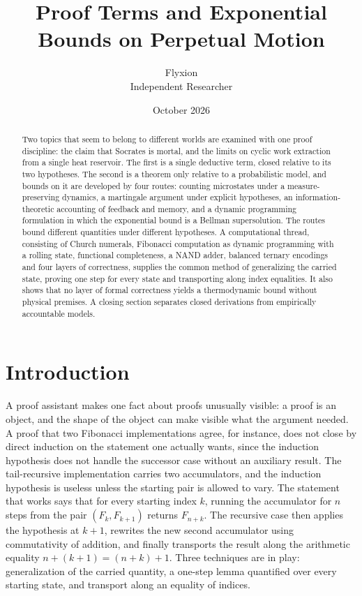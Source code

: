 \documentclass[11pt]{article}
\title{Proof Terms and Exponential Bounds on Perpetual Motion}
\author{Flyxion\\Independent Researcher}
\date{October 2026}
\theoremstyle{definition}
\theoremstyle{remark}
\begin{document}
\maketitle

\begin{abstract}
\noindent
Two topics that seem to belong to different worlds are examined with one proof discipline: the claim that Socrates is mortal, and the limits on cyclic work extraction from a single heat reservoir. The first is a single deductive term, closed relative to its two hypotheses. The second is a theorem only relative to a probabilistic model, and bounds on it are developed by four routes: counting microstates under a measure-preserving dynamics, a martingale argument under explicit hypotheses, an information-theoretic accounting of feedback and memory, and a dynamic programming formulation in which the exponential bound is a Bellman supersolution. The routes bound different quantities under different hypotheses. A computational thread, consisting of Church numerals, Fibonacci computation as dynamic programming with a rolling state, functional completeness, a NAND adder, balanced ternary encodings and four layers of correctness, supplies the common method of generalizing the carried state, proving one step for every state and transporting along index equalities. It also shows that no layer of formal correctness yields a thermodynamic bound without physical premises. A closing section separates closed derivations from empirically accountable models.
\end{abstract}

\section{Introduction}

A proof assistant makes one fact about proofs unusually visible: a proof is an object, and the shape of the object can make visible what the argument needed. A proof that two Fibonacci implementations agree, for instance, does not close by direct induction on the statement one actually wants, since the induction hypothesis does not handle the successor case without an auxiliary result. The tail-recursive implementation carries two accumulators, and the induction hypothesis is useless unless the starting pair is allowed to vary. The statement that works says that for every starting index $k$, running the accumulator for $n$ steps from the pair $(F_k, F_{k+1})$ returns $F_{n+k}$. The recursive case then applies the hypothesis at $k+1$, rewrites the new second accumulator using commutativity of addition, and finally transports the result along the arithmetic equality $n + (k+1) = (n+k) + 1$. Three techniques are in play: generalization of the carried quantity, a one-step lemma quantified over every starting state, and transport along an equality of indices.
\end{document}
